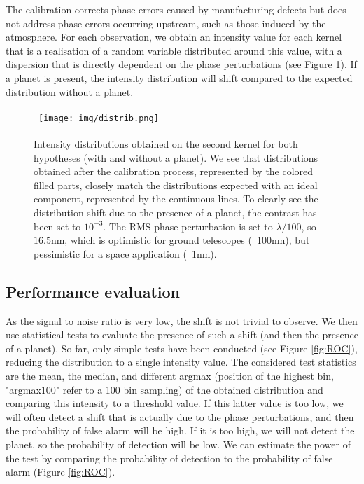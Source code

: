 \documentclass[]{spie}  %
\begin{document}
The calibration corrects phase errors caused by manufacturing defects but does not address phase errors occurring upstream, such as those induced by the atmosphere. For each observation, we obtain an intensity value for each kernel that is a realisation of a random variable  distributed around this value, with a dispersion that is directly dependent on the phase perturbations (see Figure \ref{fig:distrib}). If a planet is present, the intensity distribution will shift compared to the expected distribution without a planet. 

\begin{figure} [H]
    \begin{center}
    \begin{tabular}{c}
    \texttt{[image: img/distrib.png]}
    \end{tabular}
    \end{center}
    \caption[distrib] 
    { \label{fig:distrib} 
    Intensity distributions obtained on the second kernel for both hypotheses (with and without a planet). We see that distributions obtained after the calibration process, represented by the colored filled parts, closely match the distributions expected with an ideal component, represented by the continuous lines. To clearly see the distribution shift due to the presence of a planet, the contrast has been set to $10^{-3}$. The RMS phase perturbation is set to $\lambda / 100$, so $16.5$nm, which is optimistic for ground telescopes (~100nm), but pessimistic for a space application (~1nm).}
\end{figure}

\subsection*{Performance evaluation}

As the signal to noise ratio is very low, the shift is not trivial to observe. We then use statistical tests to evaluate the presence of such a shift (and then the presence of a planet). So far, only simple tests have been conducted (see Figure \ref{fig:ROC}), reducing the distribution to a single intensity value. The considered test statistics are the mean, the median, and different argmax (position of the highest bin, "argmax100" refer to a 100 bin sampling) of the obtained distribution and comparing this intensity to a threshold value. If this latter value is too low, we will often detect a shift that is actually due to the phase perturbations, and then the probability of false alarm will be high. If it is too high, we will not detect the planet, so the probability of detection will be low. We can estimate the power of the test by comparing the probability of detection to the probability of false alarm (Figure \ref{fig:ROC}).
\end{document}
